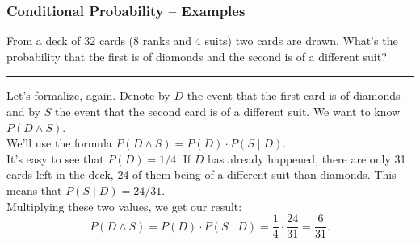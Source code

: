 \documentclass[aspectratio=169,11pt,usenames,dvipsnames]{beamer}
\begin{document}
\begin{frame}
 \frametitle{Conditional Probability -- Examples}
 From a deck of 32 cards (8 ranks and 4 suits) two cards are drawn. What's the
 probability that the first is of diamonds and the second is of a different
 suit?
 \vspace{1em}
 \hrule
 Let's formalize, again. Denote by $D$ the event that the first card is of
 diamonds and by $S$ the event that the second card is of a different suit. We
 want to know $P(D \wedge S)$.\pause\\
 We'll use the formula $P(D \wedge S) = P(D) \cdot P(S \mid D)$.\pause\\
 It's easy to see that $P(D) = 1 / 4$. \pause
 If $D$ has already happened, there are only 31 cards left in the deck, 24 of
 them being of a different suit than diamonds. This means that $P(S \mid D) = 24
 / 31$.\pause\\
 Multiplying these two values, we get our result:
 \[
  P(D \wedge S) = P(D) \cdot P(S \mid D) = \frac{1}{4} \cdot \frac{24}{31} =
  \frac{6}{31}.
 \]
\end{frame}
\end{document}
